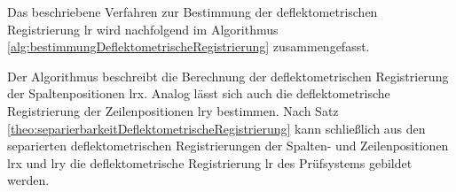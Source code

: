 \p
Das beschriebene Verfahren zur Bestimmung der deflektometrischen Registrierung \acrshort{lr} wird nachfolgend im Algorithmus \ref{alg:bestimmungDeflektometrischeRegistrierung} zusammengefasst.

{
	\FloatBarrier
	
}

\noindent
Der Algorithmus beschreibt die Berechnung der deflektometrischen Registrierung der Spaltenpositionen \acrshort{lrx}.
Analog lässt sich auch die deflektometrische Registrierung der Zeilenpositionen \acrshort{lry} bestimmen.
Nach Satz \ref{theo:separierbarkeitDeflektometrischeRegistrierung} kann schließlich aus den separierten deflektometrischen Registrierungen der Spalten- und Zeilenpositionen \acrshort{lrx} und \acrshort{lry} die deflektometrische Registrierung \acrshort{lr} des Prüfsystems gebildet werden.
